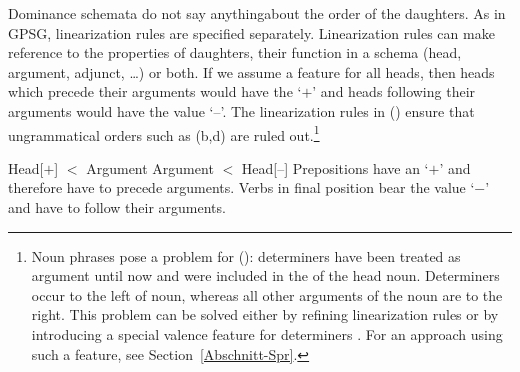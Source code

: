\addlines
Dominance schemata do not say anything\indexgpsg about the order of the daughters. As in GPSG, linearization rules are specified separately.
Linearization rules can make reference to the properties of daughters, their function in a schema (head, argument,
adjunct, \ldots) or both.
If we assume a feature \initial{} for all heads, then heads which precede their arguments would have the \initialv `$+$' and heads following their
  arguments would have the value `--'. The linearization rules in () ensure that ungrammatical orders such as (b,d) are
  ruled out.\footnote{
  Noun phrases pose a problem for (): determiners have been treated as argument until now and were included in the \subcatl of the
  head noun. Determiners occur to the left of noun, whereas all other arguments of the noun are to the right. This problem can be solved either
  by refining linearization rules \citep[--165]{Mueller99a} or by introducing a special valence feature for determiners
  \citep[Section~9.4]{ps2}. For an approach using such a
  feature, see Section~\ref{Abschnitt-Spr}.%
}

\eal
\ex\label{lp-ini-arg} 
Head[\initial$+$] $<$ Argument
\ex 
Argument $<$ Head[\initial --]
\zl
Prepositions have an \initialv `$+$' and therefore have to precede arguments. Verbs in final position bear the value `$-$' and have to follow
their arguments.
\eal
{}
\ex[*]{
\gll {}[[den Schrank] in]\\
     \hspaceThis{[[}the cupboard in\\
}
\zl

